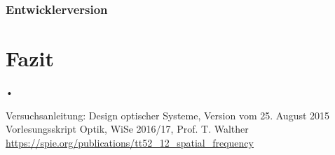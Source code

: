 \documentclass[twoside,colorback,accentcolor=tud4c,11pt]{tudreport}
\begin{document}
\subsection{Entwicklerversion}

\chapter{Fazit}	
•
\renewcommand{\bibname}{Literatur}
\begin{thebibliography}{0}
 Versuchsanleitung: Design optischer Systeme, Version vom 25. August 2015
 Vorlesungsskript Optik, WiSe 2016/17, Prof. T. Walther
 \url{https://spie.org/publications/tt52_12_spatial_frequency}

\end{thebibliography}
\end{document}
